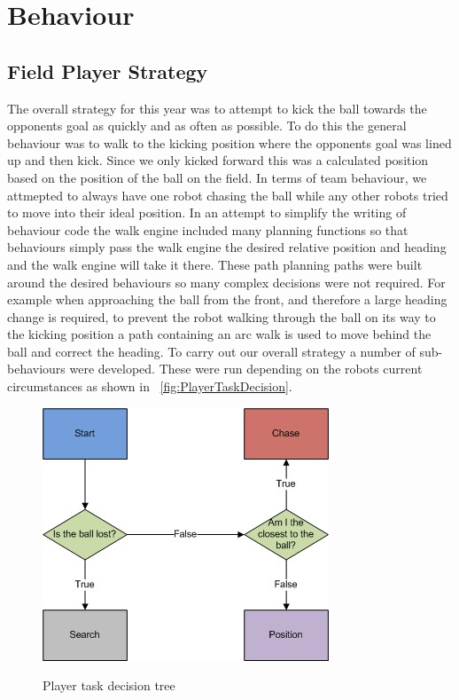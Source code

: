 \section{Behaviour}
\label{Behaviour}
\subsection{Field Player Strategy}
The overall strategy for this year was to attempt to kick the ball towards the opponents goal as quickly and as often as possible. To do this the general behaviour was to walk to the kicking position where the opponents goal was lined up and then kick. Since we only kicked forward this was a calculated position based on the position of the ball on the field. In terms of team behaviour, we attmepted to always have one robot chasing the ball while any other robots tried to move into their ideal position. In an attempt to simplify the writing of behaviour code the walk engine included many planning functions so that behaviours simply pass the walk engine the desired relative position and heading and the walk engine will take it there. These path planning paths were built around the desired behaviours so many complex decisions were not required. For example when approaching the ball from the front, and therefore a large heading change is required, to prevent the robot walking through the ball on its way to the kicking position a path containing an arc walk is used to move behind the ball and correct the heading. To carry out our overall strategy a number of sub-behaviours were developed. These were run depending on the robots current circumstances as shown in ~\autoref{fig:PlayerTaskDecision}.

\begin{figure}[htpb]
\begin{center}
   \leavevmode
    \scalebox{0.8} {\includegraphics{figs/FieldPlayerTaskDecision.jpg} }
    \caption{Player task decision tree}
    \label{fig:PlayerTaskDecision}
\end{center}
\end{figure}



